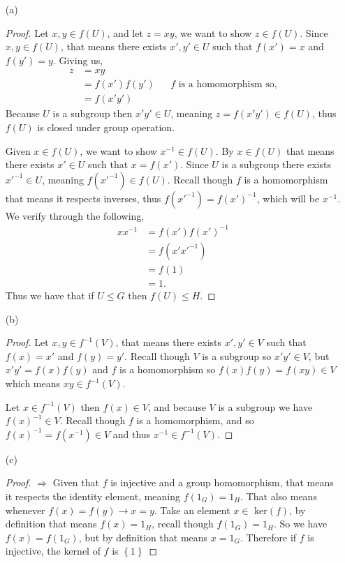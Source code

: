 \documentclass[10pt]{article}
\newcommand{\set}[1]{\left\{#1\right\}} %
\renewcommand{\leq}{\leqslant}
\begin{document}
    \begin{itemize}
        \item[(a)]
        \begin{proof} 
            Let $x,y \in f(U)$, and let $z = xy$, we want to show $z\in f(U)$. Since $x,y \in f(U)$, that means there exists $x',y' \in U$ such that $f(x') = x$ and $f(y') = y$. Giving us,
            \begin{align*}
                z &= xy \\
                &= f(x')f(y') &&\text{$f$ is a homomorphism so,} \\
                &= f(x'y') 
            \end{align*} 
            Because $U$ is a subgroup then $x'y' \in U$, meaning $z = f(x'y')\in f(U)$, thus $f(U)$ is closed under group operation.
            
            Given $x\in f(U)$, we want to show $x^{-1}\in f(U)$. By $x\in f(U)$ that means there exists $x'\in U$ such that $x = f(x')$. Since $U$ is a subgroup there exists $x'^{-1} \in U$, meaning $f(x'^{-1})\in f(U)$. Recall though $f$ is a homomorphism that means it respects inverses, thus $f(x'^{-1}) = f(x')^{-1}$, which will be $x^{-1}$. We verify through the following,
            \begin{align*}
                xx^{-1} &= f(x')f(x')^{-1} \\
                &= f(x'x'^{-1}) \\
                &= f(1) \\
                &= 1.
            \end{align*}
            Thus we have that if $U\leq G$ then $f(U) \leq H$. 
        \end{proof}
        \item[(b)] 
        \begin{proof}
            Let $x,y \in f^{-1}(V)$, that means there exists $x',y' \in V$ such that $f(x) = x'$ and $f(y) = y'$. Recall though $V$ is a subgroup so $x'y' \in V$, but $x'y' = f(x)f(y)$ and $f$ is a homomorphism so $f(x)f(y) = f(xy) \in V$ which means $xy \in f^{-1}(V)$. 
            
            
            Let $x\in f^{-1}(V)$ then $f(x) \in V$, and because $V$ is a subgroup we have $f(x)^{-1} \in V$. Recall though $f$ is a homomorphism, and so $f(x)^{-1} = f(x^{-1}) \in V$ and thus $x^{-1} \in f^{-1}(V)$. 
        \end{proof}
        \item[(c)] 
        \begin{proof}
            $\Rightarrow$ Given that $f$ is injective and a group homomorphism, that means it respects the identity element, meaning $f(1_G) = 1_H$. That also means whenever $f(x) = f(y) \rightarrow x = y$. Take an element $x\in $ ker$(f)$, by definition that means $f(x) = 1_H$, recall though $f(1_G) = 1_H$. So we have $f(x) = f(1_G)$, but by definition that means $x = 1_G$. Therefore if $f$ is injective, the kernel of $f$ is $\set{1}$


\end{proof}
\end{itemize}
\end{document}
